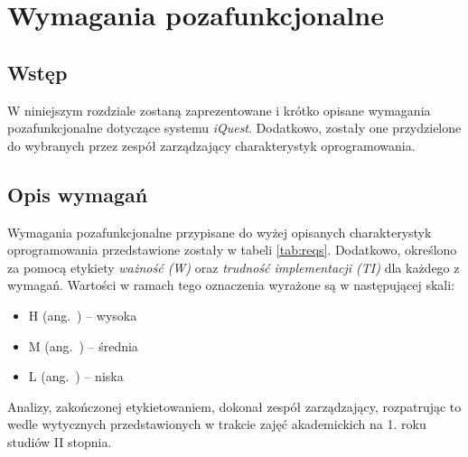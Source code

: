 \chapter{Wymagania pozafunkcjonalne}
\label{Chapter4}

\section{Wstęp}
\label{Chapter41}

W niniejszym rozdziale zostaną zaprezentowane i krótko opisane wymagania pozafunkcjonalne dotyczące systemu \textit{iQuest}. Dodatkowo, zostały one przydzielone do wybranych przez zespół zarządzający charakterystyk oprogramowania.

\section{Opis wymagań}
\label{Chapter42}

Wymagania pozafunkcjonalne przypisane do wyżej opisanych charakterystyk oprogramowania przedstawione zostały w tabeli \ref{tab:reqs}. Dodatkowo, określono za pomocą etykiety \emph{ważność (W)} oraz \emph{trudność implementacji (TI)} dla każdego z wymagań. Wartości w ramach tego oznaczenia wyrażone są w następującej skali:

\begin{itemize}
\item{H (ang.~) -- wysoka}
\item{M (ang.~) -- średnia}
\item{L (ang.~) -- niska}
\end{itemize}

Analizy, zakończonej etykietowaniem, dokonał zespół zarządzający, rozpatrując to wedle wytycznych przedstawionych w trakcie zajęć akademickich na 1. roku studiów II stopnia.

